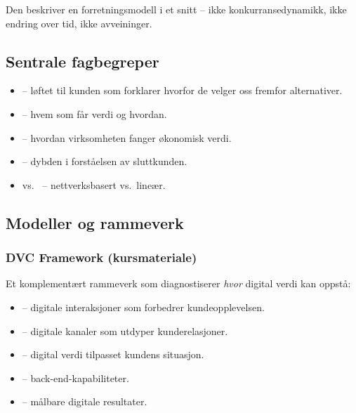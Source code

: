 Den beskriver en forretningsmodell i et snitt -- ikke konkurransedynamikk,
ikke endring over tid, ikke avveininger.

\subsection{Sentrale fagbegreper}
\begin{itemize}
  \item {} -- løftet til kunden som forklarer hvorfor de
    velger oss fremfor alternativer.
  \item {} -- hvem som får verdi og hvordan.
  \item {} -- hvordan virksomheten fanger økonomisk verdi.
  \item {} -- dybden i forståelsen av sluttkunden.
  \item {} vs.\  -- nettverksbasert vs.\ lineær.
\end{itemize}

\subsection{Modeller og rammeverk}




\subsubsection*{DVC Framework (kursmateriale)}
Et komplementært rammeverk som diagnostiserer \emph{hvor} digital verdi kan
oppstå:
\begin{itemize}
  \item {} -- digitale interaksjoner som forbedrer kundeopplevelsen.
  \item {} -- digitale kanaler som utdyper kunderelasjoner.
  \item {} -- digital verdi tilpasset kundens situasjon.
  \item {} -- back-end-kapabiliteter.
  \item {} -- målbare digitale resultater.
\end{itemize}

